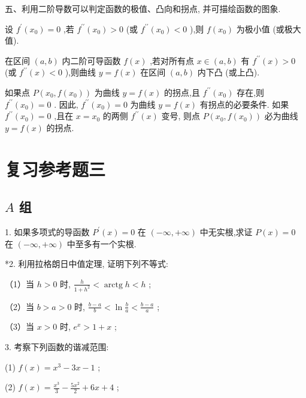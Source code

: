 \documentclass[lang=cn,newtx,12pt,scheme=chinese]{elegantbook}
\begin{document}
五、利用二阶导数可以判定函数的极值、凸向和拐点, 并可描绘函数的图象.

设 \({f}^{\prime }\left( {x}_{0}\right) = 0\) ,若 \({f}^{\prime \prime }\left( {x}_{0}\right) > 0\) (或 \({f}^{\prime \prime }\left( {x}_{0}\right) < 0\) ),则 \(f\left( {x}_{0}\right)\) 为极小值 (或极大值).

在区间 \(\left( {a,b}\right)\) 内二阶可导函数 \(f\left( x\right)\) ,若对所有点 \(x \in \left( {a,b}\right)\) 有 \({f}^{\prime \prime }\left( x\right) > 0\) (或 \({f}^{\prime \prime }\left( x\right) < 0\) ),则曲线 \(y = f\left( x\right)\) 在区间 \(\left( {a,b}\right)\) 内下凸 (或上凸).

如果点 \(P\left( {{x}_{0},f\left( {x}_{0}\right) }\right)\) 为曲线 \(y = f\left( x\right)\) 的拐点,且 \({f}^{\prime \prime }\left( {x}_{0}\right)\) 存在,则 \({f}^{\prime \prime }\left( {x}_{0}\right) = 0\) . 因此, \({f}^{\prime \prime }\left( {x}_{0}\right) = 0\) 为曲线 \(y = f\left( x\right)\) 有拐点的必要条件. 如果 \({f}^{\prime \prime }\left( {x}_{0}\right) = 0\) ,且在 \(x = {x}_{0}\) 的两侧 \({f}^{\prime \prime }\left( x\right)\) 变号, 则点 \(P\left( {{x}_{0},f\left( {x}_{0}\right) }\right)\) 必为曲线 \(y = f\left( x\right)\) 的拐点.

\chapter*{复习参考题三}

\section*{\(A\) 组}

1. 如果多项式的导函数 \({P}^{\prime }\left( x\right) = 0\) 在 \(\left( {-\infty , + \infty }\right)\) 中无实根,求证 \(P\left( x\right) = 0\) 在 \(\left( {-\infty , + \infty }\right)\) 中至多有一个实根.

*2. 利用拉格朗日中值定理, 证明下列不等式:

（1）当 \(h > 0\) 时, \(\frac{h}{1 + {h}^{2}} < \operatorname{arctg}h < h\) ;

（2）当 \(b > a > 0\) 时, \(\frac{b - a}{b} < \ln \frac{b}{a} < \frac{b - a}{a}\) ;

（3）当 \(x > 0\) 时, \({e}^{x} > 1 + x\) ;

3. 考察下列函数的谐减范围:

(1) \(f\left( x\right) = {x}^{3} - {3x} - 1\) ;

(2) \(f\left( x\right) = \frac{{x}^{3}}{3} - \frac{5{x}^{2}}{2} + {6x} + 4\) ;
\end{document}
